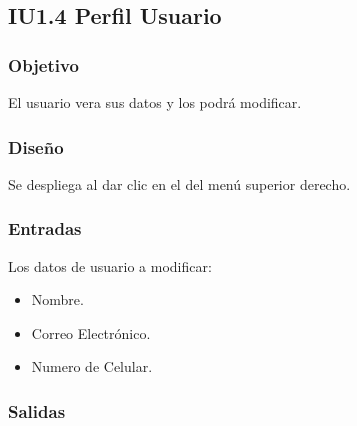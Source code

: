 \newpage
\subsection{IU1.4 Perfil Usuario}

\subsubsection{Objetivo}
	El usuario vera sus datos y los podrá modificar.

\subsubsection{Diseño}
	Se despliega al dar clic en el  del menú superior derecho.


\subsubsection{Entradas}
Los datos de usuario a modificar:
\begin{itemize}
	\item Nombre.
	\item Correo Electrónico.
	\item Numero de Celular.
\end{itemize}

\subsubsection{Salidas}
\begin{Citemize}
	\item {}
	\item {}
	\item {}
	\item {}
	\item {}
\end{Citemize}
